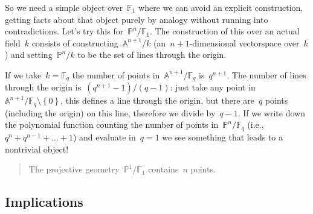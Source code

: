 So we need a simple object over~$\mathbb{F}_1$ where we can avoid an explicit construction, getting facts about that object purely by analogy without running into contradictions. Let's try this for~$\mathbb{P}^n/\mathbb{F}_1$. The construction of this over an actual field~$k$ consists of constructing~$\mathbb{A}^{n+1}/k$ (an~$n+1$\nobreakdash-dimensional vectorspace over~$k$) and setting~$\mathbb{P}^n/k$ to be the set of lines through the origin.

If we take~$k=\mathbb{F}_q$ the number of points in~$\mathbb{A}^{n+1}/\mathbb{F}_q$ is~$q^{n+1}$. The number of lines through the origin is~$(q^{n+1}-1)/(q-1)$: just take any point in~$\mathbb{A}^{n+1}/\mathbb{F}_q\setminus\left\{ 0 \right\}$, this defines a line through the origin, but there are~$q$ points (including the origin) on this line, therefore we divide by~$q-1$. If we write down the polynomial function counting the number of points in~$\mathbb{P}^n/\mathbb{F}_q$ (i.e.,~$q^n+q^{n-1}+\ldots+1$) and evaluate in~$q=1$ we see something that leads to a nontrivial object! 

\begin{quote}
  The projective geometry~$\mathbb{P}^1/\mathbb{F}_1$ contains~$n$ points.
\end{quote}

\subsection{Implications}
